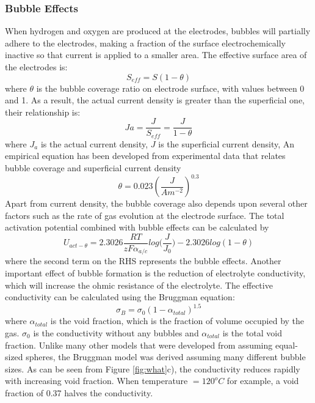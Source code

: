 \documentclass[11pt, a4paper]{article}
\begin{document}
\subsubsection{Bubble Effects}
When hydrogen and oxygen are produced at the electrodes, bubbles will partially adhere to the electrodes, making a fraction of the surface electrochemically inactive so that current is applied to a smaller area. The effective surface area of the electrodes is:\cite{bubble2}
\begin{equation} 
S_{eff} = S(1-\theta)
\end{equation}
where $\theta$ is the bubble coverage ratio on electrode surface, with values between 0 and 1. As a result, the actual current density is greater than the superficial one, their relationship is:\cite{bubble2}
\begin{equation} 
Ja = \frac{J}{S_{eff}} = \frac{J}{1-\theta}
\end{equation} 
where $J_a$ is the actual current density, $J$ is the superficial current density, An empirical equation has been developed from experimental data that relates bubble coverage and superficial current density \cite{bubble2} 
\begin{equation}
\theta = 0.023(\frac{J}{Am^{-2}})^{0.3}
\end{equation} 
Apart from current density, the bubble coverage also depends upon several other factors such as the rate of gas evolution at the electrode surface.\cite{bubble2} The total activation potential combined with bubble effects can be calculated by\cite{activation4} 
\begin{equation} 
U_{act-\theta} = 2.3026\frac{RT}{zF\alpha_{a/c}}{log(\frac{J}{J_0}}) - 2.3026log(1-\theta) 
\end{equation} 
where the second term on the RHS represents the bubble effects. Another important effect of bubble formation is  the reduction of electrolyte conductivity, which will increase the ohmic resistance of the electrolyte. The effective conductivity  can be calculated using the Bruggman equation:\cite{void} 
\begin{equation}
\sigma_B = \sigma_0(1- \alpha_{total})^{1.5}
\end{equation}
where $\alpha_{total}$ is the void fraction, which is the fraction of volume occupied by the gas. $\sigma_0$ is the conductivity without any bubbles and $\alpha_{total}$ is the total void fraction. Unlike many other models  that were developed from assuming equal-sized spheres, the Bruggman model was derived assuming many different bubble sizes.  As can be seen from Figure \ref{fig:what}c), the conductivity reduces rapidly with increasing void fraction. When temperature $= 120^oC$ for example, a void fraction of 0.37 halves the conductivity. %
\end{document}
